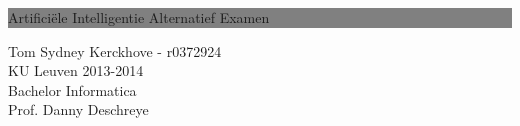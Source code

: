 \documentclass[10pt]{report}
\begin{document}
\begin{titlepage}


\thispagestyle{empty} %


\colorbox{grey}
{
	\parbox[t]{1.0\linewidth}
	{
		\centering \fontsize{50pt}{70pt}\selectfont 
		\vspace*{0.7cm}
		 Artifici\"ele Intelligentie
		\hfill Alternatief Examen\par
		\vspace*{0.7cm} 
	}
}


\vfill %


{
\centering \Large 
\hfill Tom Sydney Kerckhove - r0372924\\
\hfill KU Leuven 2013-2014\\
\hfill Bachelor Informatica \\
\hfill Prof. Danny Deschreye\\
}


\clearpage %

\end{titlepage}
\newpage


\tableofcontents








\end{document}
